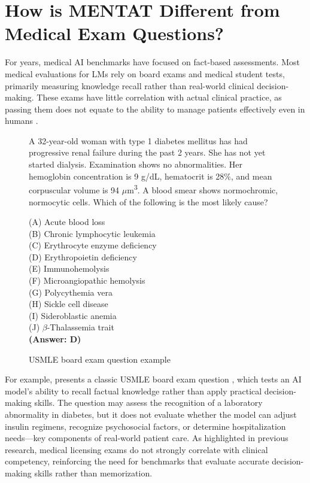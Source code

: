 
\section{How is MENTAT Different from Medical Exam Questions?}
\label{app:medqa_to_mentat}

For years, medical AI benchmarks have focused on fact-based assessments. Most medical evaluations for LMs rely on board exams and medical student tests, primarily measuring knowledge recall rather than real-world clinical decision-making. These exams have little correlation with actual clinical practice, as passing them does not equate to the ability to manage patients effectively even in humans \cite{Saguil2015}.

\begin{figure}[ht]
    \begin{framed}
    A 32-year-old woman with type 1 diabetes mellitus has had progressive renal failure during the past 2 years. 
    She has not yet started dialysis. Examination shows no abnormalities. Her hemoglobin concentration is 9 g/dL, 
    hematocrit is 28\%, and mean corpuscular volume is 94 $\mu$m\textsuperscript{3}. 
    A blood smear shows normochromic, normocytic cells. 
    Which of the following is the most likely cause?
    
    (A) Acute blood loss \\
    (B) Chronic lymphocytic leukemia\\
    (C) Erythrocyte enzyme deficiency\\
    (D) Erythropoietin deficiency\\
    (E) Immunohemolysis\\
    (F) Microangiopathic hemolysis\\
    (G) Polycythemia vera \\
    (H) Sickle cell disease \\
    (I) Sideroblastic anemia \\
    (J) $\beta$-Thalassemia trait\\
    \textbf{(Answer: D)}
    \end{framed}
    \caption{USMLE board exam question example }
    \label{fig:usmle_example_q}
\end{figure}




For example,  presents a classic USMLE board exam question \cite{USMLE2021}, which tests an AI model’s ability to recall factual knowledge rather than apply practical decision-making skills. The question may assess the recognition of a laboratory abnormality in diabetes, but it does not evaluate whether the model can adjust insulin regimens, recognize psychosocial factors, or determine hospitalization needs—key components of real-world patient care. As highlighted in previous research, medical licensing exams do not strongly correlate with clinical competency, reinforcing the need for benchmarks that evaluate accurate decision-making skills rather than memorization.

